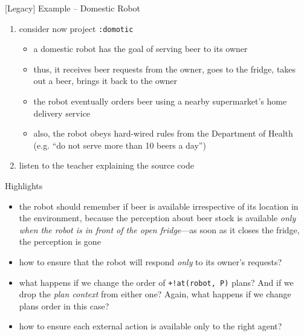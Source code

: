 \documentclass[presentation]{beamer}\mode<presentation>{\usetheme{AMSBolognaFC}}
\begin{document}
\begin{frame}[c]{[Legacy] Example -- Domestic Robot}
    \begin{enumerate}
        \item consider now project \alert{\texttt{:domotic}}
    
        \begin{itemize}
            \item a domestic robot has the goal of serving beer to its owner
            \item thus, it receives beer requests from the owner, goes to the fridge, takes out a beer, brings it back to the owner
            \item the robot eventually orders beer using a nearby supermarket's home delivery service
            \item also, the robot obeys hard-wired rules from the Department of Health (e.g. ``do not serve more than 10 beers a day'')
        \end{itemize}
    
        \vfill
        
        \item listen to the teacher explaining the source code
    \end{enumerate}
\end{frame} 

\begin{frame}[c]{Highlights}
    \begin{itemize}
        \item the robot should remember if beer is available irrespective of its location in the environment, because the \alert{perception} about beer stock is available \emph{only when the robot is in front of the open fridge}---as soon as it closes the fridge, the perception is gone
        
        \vfill
        
        \item how to ensure that the robot will respond \emph{only} to its owner's requests?
        
        \vfill
        
        \item what happens if we change the order of \texttt{+!at(robot, P)} plans? And if we drop the \emph{plan context} from either one? Again, what happens if we change plans order in this case?
        
        \vfill
        
        \item how to ensure each external action is available only to the right agent?
    \end{itemize}
\end{frame} 
\end{document}
